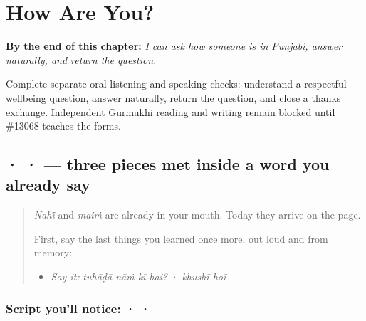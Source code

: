 
\chapter{How Are You?}
\label{ch:responding}

\begin{chapteropening}
\textbf{By the end of this chapter:} \emph{I can ask how someone is in Punjabi, answer naturally, and return the question.}

Complete separate oral listening and speaking checks: understand a respectful wellbeing question, answer naturally, return the question, and close a thanks exchange. Independent Gurmukhi reading and writing remain blocked until \#13068 teaches the forms.
\end{chapteropening}

\section[\texorpdfstring{\pa{ਨ} · \pa{ੀ} · \pa{ੈ} (na · -ī · -ai)}{ਨ · ੀ · ੈ (na · -ī · -ai)}]{ ·  ·  — three pieces met inside a word you already say}

\label{lesson:PA-S03-nanna-bihari-dulava}



\begin{quote}
\emph{Nahī̃} and \emph{maiṁ} are already in your mouth. Today they arrive on the page.

First, say the last things you learned once more, out loud and from memory:

\begin{itemize}
\raggedright
  \item \emph{Say it:} \emph{tuhāḍā nāṁ kī hai?} · \emph{khushī hoī}
\end{itemize}
\end{quote}

\subsection*{Script you'll notice:  ·  · }
\begin{quote}
\end{quote}

